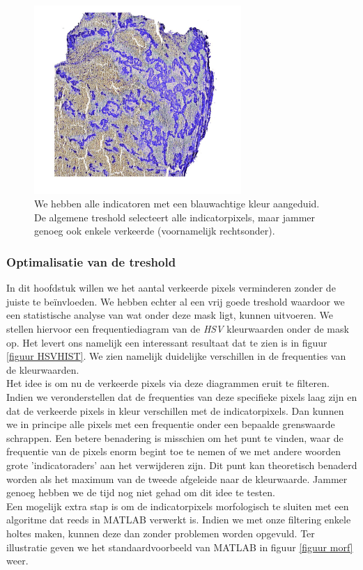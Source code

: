 \documentclass[a4paper,kulak]{kulakarticle}
\begin{document}
\begin{figure}[H]
	\centering
	\includegraphics[width = 0.7\textwidth]{algemene_treshold}
	
	\caption{We hebben alle indicatoren met een blauwachtige kleur aangeduid. De algemene treshold selecteert alle indicatorpixels, maar jammer genoeg ook enkele verkeerde (voornamelijk rechtsonder).}
	\label{figuur alg_tresh}
\end{figure}

\subsubsection{Optimalisatie van de treshold}
In dit hoofdstuk willen we het aantal verkeerde pixels verminderen zonder de juiste te beïnvloeden. We hebben echter al een vrij goede treshold waardoor we een statistische analyse van wat onder deze mask ligt, kunnen uitvoeren. We stellen hiervoor een frequentiediagram van de \textit{HSV} kleurwaarden onder de mask op. Het levert ons namelijk een interessant resultaat dat te zien is in figuur  \ref{figuur HSVHIST}. We zien namelijk duidelijke verschillen in de frequenties van de kleurwaarden. \\
Het idee is om nu de verkeerde pixels via deze diagrammen eruit te filteren. Indien we veronderstellen dat de frequenties van deze specifieke pixels laag zijn en dat de verkeerde pixels in kleur verschillen met de indicatorpixels. Dan kunnen we in principe alle pixels met een frequentie onder een bepaalde grenswaarde schrappen. Een betere benadering is misschien om het punt te vinden, waar de frequentie van de pixels enorm begint toe te nemen of we met andere woorden grote 'indicatoraders' aan het verwijderen zijn. Dit punt kan theoretisch benaderd worden als het maximum van de tweede afgeleide naar de kleurwaarde. Jammer genoeg hebben we de tijd nog niet gehad om dit idee te testen. \\
Een mogelijk extra stap is om de indicatorpixels morfologisch te sluiten met een algoritme dat reeds in MATLAB verwerkt is. Indien we met onze filtering enkele holtes maken, kunnen deze dan zonder problemen worden opgevuld. Ter illustratie geven we het standaardvoorbeeld van MATLAB in figuur \ref{figuur morf} weer.
\end{document}
